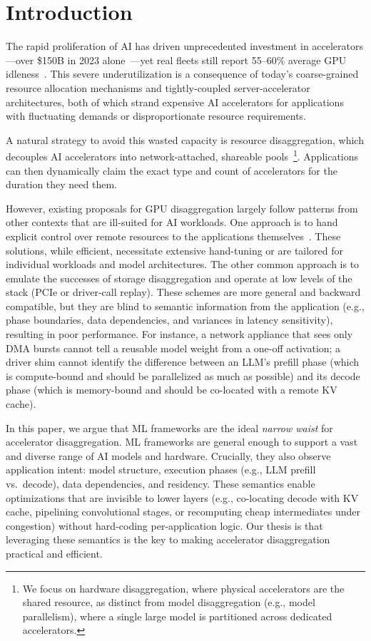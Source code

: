 \section{Introduction}
\label{sec:introduction}
The rapid proliferation of AI has driven unprecedented investment in accelerators---over \$150B 
in 2023 alone~\cite{datacenter-accelerators-2024}---yet real fleets still report 55--60\% average GPU idleness~\cite{register-gpu-utilization-2024}. 
This severe underutilization is a consequence of today's coarse-grained resource allocation mechanisms and tightly-coupled server-accelerator architectures, both of which strand expensive AI accelerators for applications with fluctuating demands or disproportionate resource requirements.


A natural strategy to avoid this wasted capacity is resource disaggregation, which decouples AI accelerators into network-attached, shareable pools~\cite{logos,federated_coherence,lim2012system,gimbal}\footnote{We focus on hardware disaggregation, where physical accelerators are the shared resource, as distinct from model disaggregation (e.g., model parallelism), where a single large model is partitioned across dedicated accelerators.}.
Applications can then dynamically claim the exact type and count of accelerators for the duration they need them.

However, existing proposals for GPU disaggregation largely follow patterns from other contexts that are ill-suited for AI workloads.
One approach is to hand explicit control over remote resources to the applications themselves~\cite{distserve-2024,prism-2025}.
These solutions, while efficient, necessitate extensive hand-tuning or are tailored for individual workloads and model architectures.
The other common approach is to emulate the successes of storage disaggregation and operate at low levels of the stack
  (PCIe or driver-call replay).
These schemes are more general and backward compatible, but they are blind to semantic information from the application (e.g., phase boundaries, data dependencies, and variances in latency sensitivity), resulting in poor performance.
For instance, a network appliance that sees only DMA bursts cannot tell a reusable model weight from a one-off activation; 
a driver shim cannot identify the difference between an LLM's prefill phase (which is compute-bound and should be parallelized as much as possible) and its decode phase (which is memory-bound and should be co-located with a remote KV cache).

In this paper, we argue that ML frameworks are the ideal \emph{narrow waist} for accelerator disaggregation.
ML frameworks are general enough to support a vast and diverse range of AI models and hardware.
Crucially, they also observe application intent: model structure, execution phases (e.g., LLM prefill vs.\ decode), data dependencies, and residency.
These semantics enable optimizations that are invisible to lower layers (e.g., co-locating decode with KV cache, pipelining convolutional stages, or recomputing cheap intermediates under congestion) without hard-coding per-application logic.
Our thesis is that leveraging these semantics is the key to making accelerator disaggregation practical and efficient.


